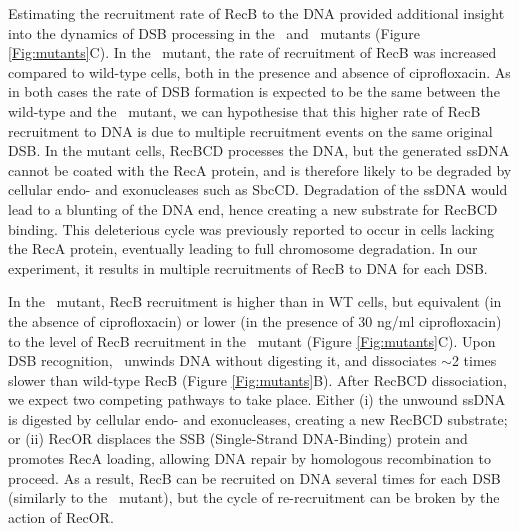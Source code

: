 Estimating the recruitment rate of RecB to the DNA provided additional insight into the dynamics of DSB processing in the \dreca\ and \teneighty\ mutants (Figure \ref{Fig:mutants}C). In the \dreca\ mutant, the rate of recruitment of RecB was increased compared to wild-type cells, both in the presence and absence of ciprofloxacin. As in both cases the rate of DSB formation is expected to be the same between the wild-type and the \dreca\ mutant, we can hypothesise that this higher rate of RecB recruitment to DNA is due to multiple recruitment events on the same original DSB. In the mutant cells, RecBCD processes the DNA, but the generated ssDNA cannot be coated with the RecA protein, and is therefore likely to be degraded by cellular endo- and exonucleases such as SbcCD. Degradation of the ssDNA would lead to a blunting of the DNA end, hence creating a new substrate for RecBCD binding. This deleterious cycle was previously reported to occur in cells lacking the RecA protein, eventually leading to full chromosome degradation\cite{Capaldo1975,Skarstad1993}. In our experiment, it results in multiple recruitments of RecB to DNA for each DSB.

In the \teneighty\ mutant, RecB recruitment is higher than in WT cells, but equivalent (in the absence of ciprofloxacin) or lower (in the presence of 30 ng/ml ciprofloxacin) to the level of RecB recruitment in the \dreca\ mutant (Figure \ref{Fig:mutants}C). Upon DSB recognition, \teneighty\ unwinds DNA without digesting it, and dissociates $\sim$2 times slower than wild-type RecB (Figure \ref{Fig:mutants}B). After RecBCD dissociation, we expect two competing pathways to take place. Either (i) the unwound ssDNA is digested by cellular endo- and exonucleases, creating a new RecBCD substrate; or (ii) RecOR displaces the SSB (Single-Strand DNA-Binding) protein and promotes RecA loading, allowing DNA repair by homologous recombination to proceed.\cite{Ivancic-Bace_2003} As a result, RecB can be recruited on DNA several times for each DSB (similarly to the \dreca\ mutant), but the cycle of re-recruitment can be broken by the action of RecOR.

